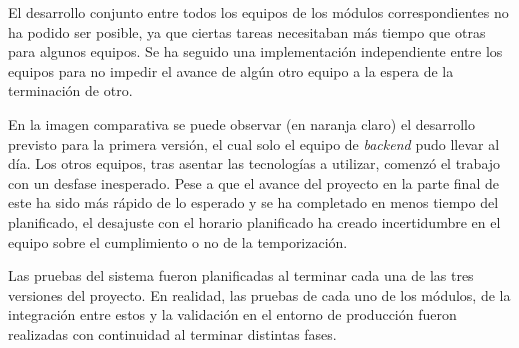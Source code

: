 \documentclass{article}
\begin{document}
El desarrollo conjunto entre todos los equipos de los módulos correspondientes no ha podido ser posible, ya que ciertas tareas necesitaban más tiempo que otras para algunos equipos. Se ha seguido una implementación independiente entre los equipos para no impedir el avance de algún otro equipo a la espera de la terminación de otro.

En la imagen comparativa se puede observar (en naranja claro) el desarrollo previsto para la primera versión, el cual solo el equipo de \textit{backend} pudo llevar al día. Los otros equipos, tras asentar las tecnologías a utilizar, comenzó el trabajo con un desfase inesperado. Pese a que el avance del proyecto en la parte final de este ha sido más rápido de lo esperado y se ha completado en menos tiempo del planificado, el desajuste con el horario planificado ha creado incertidumbre en el equipo sobre el cumplimiento o no de la temporización.

Las pruebas del sistema fueron planificadas al terminar cada una de las tres versiones del proyecto. En realidad, las pruebas de cada uno de los módulos, de la integración entre estos y la validación en el entorno de producción fueron realizadas con continuidad al terminar distintas fases.
\end{document}
